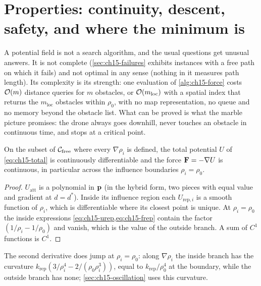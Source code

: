 \section{Properties: continuity, descent, safety, and where the minimum is}
\label{sec:ch15-properties}

A potential field is not a search algorithm, and the usual questions get
unusual answers. It is not complete (\cref{sec:ch15-failures} exhibits
instances with a free path on which it fails) and not optimal in any sense
(nothing in it measures path length). Its complexity is its strength: one
evaluation of \cref{alg:ch15-force} costs $\mathcal{O}\!\left(m\right)$ distance queries for
$m$ obstacles, or $\mathcal{O}\!\left(m_{\mathrm{loc}}\right)$ with a spatial index that returns
the $m_{\mathrm{loc}}$ obstacles within $\rho_0$, with no map representation,
no queue and no memory beyond the obstacle list. What can be proved is what the marble picture promises: the drone
always goes downhill, never touches an obstacle in continuous time, and
stops at a critical point.

\begin{proposition}
\label{thm:ch15-continuity}
On the subset of $\mathcal{C}_{\mathrm{free}}$ where every $\nabla\rho_i$ is defined, the total
potential $U$ of \cref{eq:ch15-total} is continuously differentiable and the
force $\mathbf{F} = -\nabla U$ is continuous, in particular across the
influence boundaries $\rho_i = \rho_0$.
\end{proposition}
\begin{proof}
$U_{\mathrm{att}}$ is a polynomial in $\mathbf{p}$ (in the hybrid form, two pieces
with equal value and gradient at $d = d^*$). Inside its influence region
each $U_{\mathrm{rep},i}$ is a smooth function of $\rho_i$, which is
differentiable where its closest point is unique. At $\rho_i = \rho_0$ the
inside expressions \cref{eq:ch15-urep,eq:ch15-frep} contain the factor
$(1/\rho_i - 1/\rho_0)$ and vanish, which is the value of the outside
branch. A sum of $C^1$ functions is $C^1$.
\end{proof}

The second derivative does jump at $\rho_i = \rho_0$: along $\nabla\rho_i$
the inside branch has the curvature $k_{\mathrm{rep}}(3/\rho_i^4 -
2/(\rho_0\rho_i^3))$, equal to $k_{\mathrm{rep}}/\rho_0^4$ at the boundary,
while the outside branch has none; \cref{sec:ch15-oscillation} uses this
curvature.

